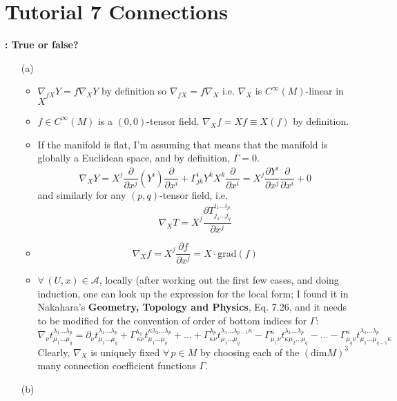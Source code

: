 \section*{Tutorial 7 Connections}

\textbf{: True or false?}

\begin{enumerate}
\item[(a)] 
\begin{itemize}
\item $\nabla_{fX}Y = f\nabla_XY$ by definition so $\nabla_{fX} = f\nabla_X$ i.e. $\nabla_X$ is $C^{\infty}(M)$-linear in $X$
\item $f\in C^{\infty}(M)$ is a $(0,0)$-tensor field. $\nabla_Xf = Xf \equiv X(f)$ by definition.
\item If the manifold is flat, I'm assuming that means that the manifold is globally a Euclidean space, and by definition, $\Gamma=0$.
\[
\nabla_X Y = X^j \frac{ \partial }{ \partial x^j} (Y^i) \frac{ \partial }{ \partial x^i } + \Gamma^i_{jk} Y^k X^k \frac{ \partial }{ \partial x^i} = X^j \frac{ \partial Y^i}{ \partial x^j} \frac{ \partial }{ \partial x^i} + 0
\]
and similarly for any $(p,q)$-tensor field, i.e.
\[
\nabla_X T = X^j \frac{ \partial T^{i_1 \dots i_p}_{ j_1 \dots j_q} }{ \partial x^j}
\]
\item \[
\nabla_X f = X^j \frac{ \partial f}{ \partial x^j} = X\cdot \text{grad}(f)
\]
\item $\forall \, (U,x) \in \mathcal{A}$, locally (after working out the first few cases, and doing induction, one can look up the expression for the local form; I found it in Nakahara's \textbf{Geometry, Topology and Physics}, Eq. 7.26, and it needs to be modified for the convention of order of bottom indices for $\Gamma$:
\[
\nabla_{\nu} t^{\lambda_1 \dots \lambda_p }_{ \mu_1 \dots \mu_q} = \partial_{\nu} t^{\lambda_1 \dots \lambda_p}_{ \mu_1 \dots \mu_q} + \Gamma^{\lambda_1}_{ \,  \kappa \nu } t^{\kappa \lambda_2 \dots \lambda_p }_{\mu_1 \dots \mu_q} + \dots + \Gamma^{\lambda_p}_{ \kappa \nu } t^{\lambda_1 \dots \lambda_{p-1} \kappa }_{ \mu_1 \dots \mu_q} - \Gamma^{\kappa}_{  \mu_1 \nu} t^{\lambda_1 \dots \lambda_p }_{ \kappa \mu_2 \dots \mu_q} - \dots - \Gamma^{\kappa}_{  \mu_q \nu} t^{\lambda_1 \dots \lambda_p }_{\mu_1 \dots \mu_{q-1} \kappa }
\]
Clearly, $\nabla_X$ is uniquely fixed $\forall \, p \in M$ by choosing each of the $(\text{dim}M)^3$ many connection coefficient functions $\Gamma$. 
\end{itemize}
\item[(b)] 

\end{enumerate}
